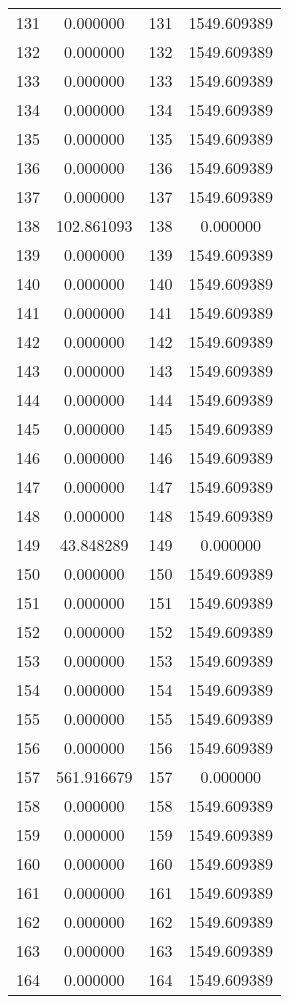 \documentclass[12pt]{article}
\begin{document}
\begin{longtable}{@{}cccc@{}}
131 & 0.000000 & 131 & 1549.609389 \\
132 & 0.000000 & 132 & 1549.609389 \\
133 & 0.000000 & 133 & 1549.609389 \\
134 & 0.000000 & 134 & 1549.609389 \\
135 & 0.000000 & 135 & 1549.609389 \\
136 & 0.000000 & 136 & 1549.609389 \\
137 & 0.000000 & 137 & 1549.609389 \\
138 & 102.861093 & 138 & 0.000000 \\
139 & 0.000000 & 139 & 1549.609389 \\
140 & 0.000000 & 140 & 1549.609389 \\
141 & 0.000000 & 141 & 1549.609389 \\
142 & 0.000000 & 142 & 1549.609389 \\
143 & 0.000000 & 143 & 1549.609389 \\
144 & 0.000000 & 144 & 1549.609389 \\
145 & 0.000000 & 145 & 1549.609389 \\
146 & 0.000000 & 146 & 1549.609389 \\
147 & 0.000000 & 147 & 1549.609389 \\
148 & 0.000000 & 148 & 1549.609389 \\
149 & 43.848289 & 149 & 0.000000 \\
150 & 0.000000 & 150 & 1549.609389 \\
151 & 0.000000 & 151 & 1549.609389 \\
152 & 0.000000 & 152 & 1549.609389 \\
153 & 0.000000 & 153 & 1549.609389 \\
154 & 0.000000 & 154 & 1549.609389 \\
155 & 0.000000 & 155 & 1549.609389 \\
156 & 0.000000 & 156 & 1549.609389 \\
157 & 561.916679 & 157 & 0.000000 \\
158 & 0.000000 & 158 & 1549.609389 \\
159 & 0.000000 & 159 & 1549.609389 \\
160 & 0.000000 & 160 & 1549.609389 \\
161 & 0.000000 & 161 & 1549.609389 \\
162 & 0.000000 & 162 & 1549.609389 \\
163 & 0.000000 & 163 & 1549.609389 \\
164 & 0.000000 & 164 & 1549.609389 \\

\end{longtable}
\end{document}
